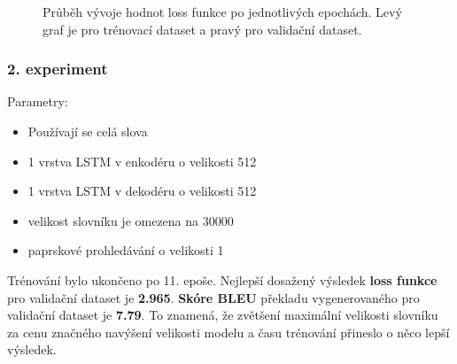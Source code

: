 \begin{figure}[H]
    \begin{center}
    \end{center}
	\caption{Průběh vývoje hodnot loss funkce po jednotlivých epochách. Levý graf je pro trénovací dataset a pravý pro validační dataset.}
\end{figure}

\subsubsection{2. experiment}\label{experiment2}
Parametry:
\begin{itemize}
  \item Používají se celá slova
  \item 1 vrstva LSTM v enkodéru o velikosti 512
  \item 1 vrstva LSTM v dekodéru o velikosti 512
  \item velikost slovníku je omezena na 30000
  \item paprskové prohledávání o velikosti 1
\end{itemize}

Trénování bylo ukončeno po 11. epoše. Nejlepší dosažený výsledek \textbf{loss funkce} pro validační dataset je \textbf{2.965}. \textbf{Skóre BLEU} překladu vygenerovaného pro validační dataset je \textbf{7.79}. To znamená, že zvětšení maximální velikosti slovníku za cenu značného navýšení velikosti modelu a času trénování přineslo o něco lepší výsledek.

